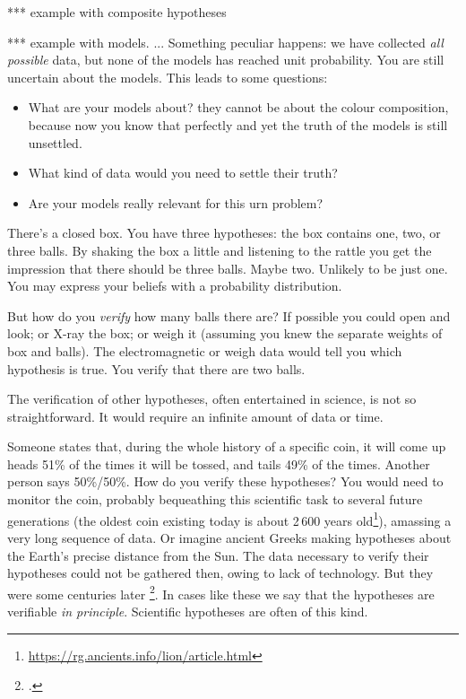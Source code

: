 \documentclass[\ifafour a4paper,12pt,\else a5paper,10pt,\fi%
onecolumn,oneside,article,%
british%
]{memoir}
\theoremstyle{remark}
\theoremstyle{innote}
\newcommand*{\citep}{\footcites}
\renewcommand*{\|}[1][]{\nonscript\,#1\vert\nonscript\;\mathopen{}}
\begin{document}
*** example with composite hypotheses

*** example with models. ... Something peculiar happens: we have collected
\emph{all possible} data, but none of the models has reached unit
probability. You are still uncertain about the models. This leads to some
questions:
\begin{itemize}
\item What are your models about? they cannot be about the colour
  composition, because now you know that perfectly and yet the truth of the
  models is still unsettled.
\item What kind of data would you need to settle their truth?
\item Are your models really relevant for this urn problem?
\end{itemize}










There's a closed box. You have three hypotheses: the box contains one, two,
or three balls. By shaking the box a little and listening to the rattle you
get the impression that there should be three balls. Maybe two. Unlikely to
be just one. You may express your beliefs with a probability distribution.

But how do you \emph{verify} how many balls there are? If possible you
could open and look; or X-ray the box; or weigh it (assuming you knew the
separate weights of box and balls). The electromagnetic or weigh data would
tell you which hypothesis is true. You verify that there are two balls.

The verification of other hypotheses, often entertained in science, is not
so straightforward. It would require an infinite amount of data or time.

Someone states that, during the whole history of a specific coin, it will
come up heads 51\% of the times it will be tossed, and tails 49\% of the
times. Another person says 50\%/50\%. How do you verify these hypotheses?
You would need to monitor the coin, probably bequeathing this scientific
task to several future generations (the oldest coin existing today is about
2\,600 years
old\footnote{\url{https://rg.ancients.info/lion/article.html}}), amassing a
very long sequence of data. Or imagine ancient Greeks making hypotheses
about the Earth's precise distance from the Sun. The data necessary to
verify their hypotheses could not be gathered then, owing to lack of
technology. But they were some centuries later \citep{goldstein1985}. In
cases like these we say that the hypotheses are verifiable \emph{in
  principle}. Scientific hypotheses are often of this kind.
\end{document}
